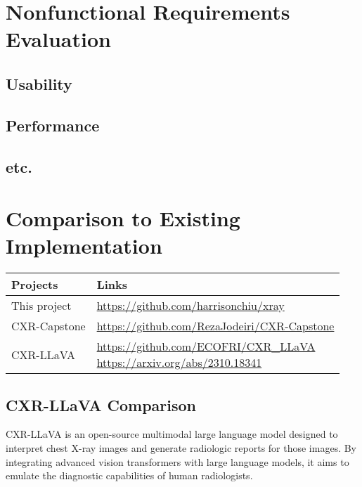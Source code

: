 \documentclass[12pt, titlepage]{article}
\begin{document}
\section{Nonfunctional Requirements Evaluation}

\subsection{Usability}
		
\subsection{Performance}

\subsection{etc.}
	
\section{Comparison to Existing Implementation}	

\begin{table}[]
  \centering
  \begin{tabular}{|l|l|}
  \hline
  \textbf{Projects} & \textbf{Links} \\ \hline
  This project & \url{https://github.com/harrisonchiu/xray} \\ \hline
  CXR-Capstone & \url{https://github.com/RezaJodeiri/CXR-Capstone} \\ \hline
  CXR-LLaVA & 
  \makecell{\url{https://github.com/ECOFRI/CXR\_LLaVA} \\ \url{https://arxiv.org/abs/2310.18341}} \\ \hline
  \end{tabular}
\end{table}

\subsection{CXR-LLaVA Comparison}
CXR-LLaVA is an open-source multimodal large language model designed to interpret chest X-ray images and generate radiologic reports for those images. By integrating advanced vision transformers with large language models, it aims to emulate the diagnostic capabilities of human radiologists.
\end{document}
